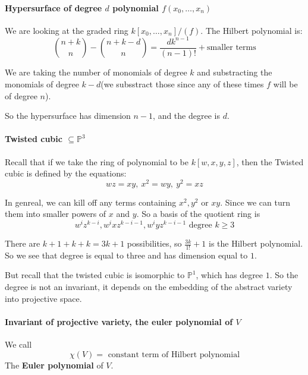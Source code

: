 \paragraph*{Hypersurface of degree $d$ polynomial $f(x_0,\ldots,x_n)$}
\begin{example}
    We are looking at the graded ring $k[x_0,\ldots,x_n]/(f)$. The Hilbert polynomial is:\[
        \binom{n+k}{n} - \binom{n+k-d}{n} = \frac{dk^{n-1}}{(n-1)!} + \text{smaller terms}    
    \]

    We are taking the number of monomials of degree $k$ and substracting the monomials of degree $k-d$(we subsstract those since any of these times $f$ will be of degree $n$).

    So the hypersurface has dimension $n-1$, and the degree is $d$.

\end{example}


\paragraph*{Twisted cubic $\subseteq\mathbb{P}^3$}
\begin{example}
    Recall that if we take the ring of polynomial to be $k[w,x,y,z]$, then the Twisted cubic is defined by the equations:\[
        wz = xy, \ x^2 = wy, \ y^2 = xz    
    \]
    
    In genreal, we can kill off any terms containing $x^2,y^2$ or $xy$. Since we can turn them into smaller powers of $x$ and $y$. So a basis of the quotient ring is \[
        w^i z^{k-i}, w^i xz^{k-i-1}, w^i yz^{k-i-1} \text{ degree }k\geq 3    
    \] 
    
    There are $k+1+k+k = 3k+1$ possibilities, so $\frac{3k}{1!}+1$ is the Hilbert polynomial. So we see that degree is equal to three and has dimension equal to $1$.
    
    But recall that the twisted cubic is isomorphic to $\mathbb{P}^1$, which has degree $1$. So the degree is not an invariant, it depends on the embedding of the abstract variety into projective space.        
\end{example}

\paragraph*{Invariant of projective variety, the euler polynomial of $V$}

\begin{definition}
    We call \[\chi(V) = \text{ constant term of Hilbert polynomial}\] The \textbf{Euler polynomial} of $V$.
\end{definition}

